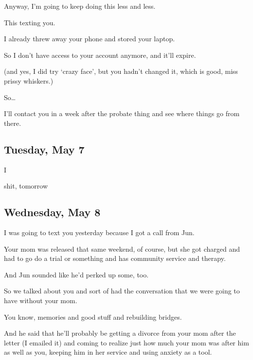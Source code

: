 { Anyway, I'm going to keep doing this less and less.

 This texting you.

 I already threw away your phone and stored your laptop.

 So I don't have access to your account anymore, and it'll expire.

(and yes, I did try `crazy face', but you hadn't changed it, which is good, miss prissy whiskers.)

 So\ldots{}

 I'll contact you in a week after the probate thing and see where things go from there.

\newpage

\subsection*{Tuesday, May 7}\label{tuesday-may-7}

 I

 shit, tomorrow

\newpage

\subsection*{Wednesday, May 8}\label{wednesday-may-8}

 I was going to text you yesterday because I got a call from Jun.

 Your mom was released that same weekend, of course, but she got charged and had to go do a trial or something and has community service and therapy.

 And Jun sounded like he'd perked up some, too.

 So we talked about you and sort of had the conversation that we were going to have without your mom.

 You know, memories and good stuff and rebuilding bridges.

 And he said that he'll probably be getting a divorce from your mom after the letter (I emailed it) and coming to realize just how much your mom was after him as well as you, keeping him in her service and using anxiety as a tool.

}
